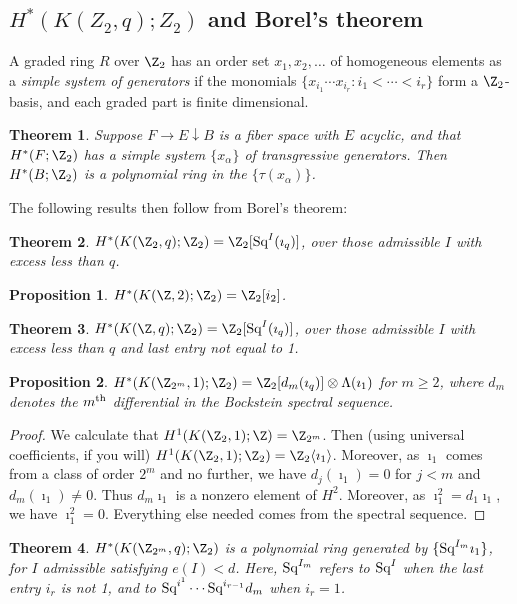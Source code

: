 \documentclass[11pt]{article}
\newcommand{\Squ}{\textup{Sq}}
\theoremstyle{plain}
\newtheorem*{thm*}{Theorem}
\newtheorem*{prop*}{Proposition}
\theoremstyle{definition}
\begin{document}
\subsection{$H^*(K(Z_2,q);Z_2)$ and Borel's theorem}
A graded ring $R$ over $\Z_2$ has an order set $x_1,x_2,\ldots$ of homogeneous elements as a \emph{simple system of generators} if the monomials $\{x_{i_1}\cdots x_{i_r}:i_1<\cdots<i_r\}$ form a $\Z_2$-basis, and each graded part is finite dimensional.
\begin{thm*}
Suppose $F\rightarrow E\downarrow B$ is a fiber space with $E$ acyclic, and that $H^*(F;\Z_2)$ has a simple system $\{x_\alpha\}$ of transgressive generators. Then $H^*(B;\Z_2)$ is a polynomial ring in the $\{\tau(x_\alpha)\}$.
\end{thm*}
The following results then follow from Borel's theorem:
\begin{thm*}
$H^*(K(\Z_2,q);\Z_2)=\Z_2[\Squ^I(\imath_q)]$, over those admissible $I$ with excess less than $q$.
\end{thm*}
\begin{prop*}
$H^*(K(\Z,2);\Z_2)=\Z_2[i_2]$.
\end{prop*}
\begin{thm*}$H^*(K(\Z,q);\Z_2)=\Z_2[\Squ^I(\imath_q)]$, over those admissible $I$ with excess less than $q$ and last entry not equal to 1.
\end{thm*}
\begin{prop*}$H^*(K(\Z_{2^m},1);\Z_2)=\Z_2[d_m(\imath_q)]\otimes \Lambda(\imath_1)$ for $m\geq2$, where $d_m$ denotes the $m^\textup{th}$ differential in the Bockstein spectral sequence.
\end{prop*}
\begin{proof}
We calculate that $H^1(K(\Z_2,1);\Z)=\Z_{2^m}$. Then (using universal coefficients, if you will) $H^1(K(\Z_2,1);\Z_2)=\Z_{2}\langle\imath_1\rangle$. Moreover, as $\imath_1$ comes from a class of order $2^m$ and no further, we have $d_j(\imath_1)=0$ for $j<m$ and $d_m(\imath_1)\neq0$. Thus $d_m\imath_1$ is a nonzero element of $H^2$. Moreover, as $\imath_1^2=d_1\imath_1$, we have $\imath_1^2=0$. Everything else needed comes from the spectral sequence.
\end{proof}
\begin{thm*}
$H^*(K(\Z_{2^m},q);\Z_2)$ is a polynomial ring generated by $\{\Squ^{I_m}\imath_1\}$, for $I$ admissible satisfying $e(I)<d$. Here, $\Squ^{I_m}$ refers to $\Squ^I$ when the last entry $i_r$ is not 1, and to $\Squ^{i^1}\cdots \Squ^{i_{r-1}}d_m$ when $i_r=1$.
\end{thm*}
\end{document}
